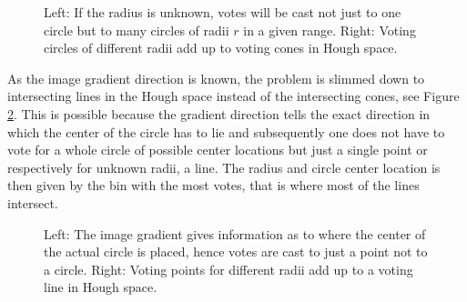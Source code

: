 \documentclass{article}
\begin{document}
\begin{figure}[htb!]
\centering
\def\svgwidth{0.95\textwidth}

\caption{Left: If the radius is unknown, votes will be cast not just to one circle but to many circles of radii $r$ in a given range.  Right: Voting circles of different radii add up to voting cones in Hough space.}\label{fig: houghTransfom2}
\end{figure}

As the image gradient direction is known, the problem is slimmed down to intersecting lines in the Hough space instead of the intersecting cones, see Figure \ref{fig: houghTransfom3}.
This is possible because the gradient direction tells the exact direction in which the center of the circle has to lie and subsequently one does not have to vote for a whole circle of possible center locations but just a single point or respectively for unknown radii, a line. The radius and circle center location is then given by the bin with the most votes, that is where most of the lines intersect.

\begin{figure}[htb!]
\centering
\def\svgwidth{0.95\textwidth}

\caption{Left: The image gradient gives information as to where the center of the actual circle is placed, hence votes are cast to just a point not to a circle. Right: Voting points for different radii add up to a voting line in Hough space.}\label{fig: houghTransfom3}
\end{figure}


%
%
%
\end{document}
